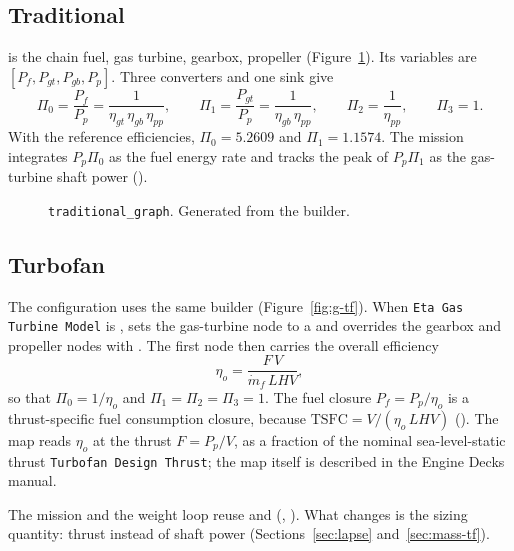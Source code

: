 \documentclass[a4paper,11pt]{article}
\begin{document}
\subsection{Traditional}\label{sec:traditional}
 is the chain fuel, gas turbine,
gearbox, propeller (Figure~\ref{fig:g-trad}). Its variables are
$[P_f, P_{gt}, P_{gb}, P_p]$. Three converters and one sink give
\begin{equation}
  \Pi_0 = \frac{P_f}{P_p} = \frac{1}{\eta_{gt}\,\eta_{gb}\,\eta_{pp}},\qquad
  \Pi_1 = \frac{P_{gt}}{P_p} = \frac{1}{\eta_{gb}\,\eta_{pp}},\qquad
  \Pi_2 = \frac{1}{\eta_{pp}},\qquad \Pi_3 = 1 .
  \label{eq:trad}
\end{equation}
With the reference efficiencies, $\Pi_0 = 5.2609$ and $\Pi_1 = 1.1574$. The mission
integrates $P_p\Pi_0$ as the fuel energy rate and tracks the peak of $P_p\Pi_1$ as the
gas-turbine shaft power ().

\begin{figure}[htbp]
\centering

\caption{\texttt{traditional\_graph}. Generated from the builder.}\label{fig:g-trad}
\end{figure}

\subsection{Turbofan}\label{sec:turbofan}
The  configuration uses the same builder (Figure~\ref{fig:g-tf}). When
\texttt{Eta Gas Turbine Model} is , 
sets the gas-turbine node to a  and overrides the gearbox and
propeller nodes with . The first node then carries the overall
efficiency
\begin{equation}
  \eta_o = \frac{F\,V}{\dot m_f\,LHV} ,
\end{equation}
so that $\Pi_0 = 1/\eta_o$ and $\Pi_1 = \Pi_2 = \Pi_3 = 1$. The fuel closure
$P_f = P_p/\eta_o$ is a thrust-specific fuel consumption closure, because
$\mathrm{TSFC} = V/(\eta_o\,LHV)$ (). The map reads
$\eta_o$ at the thrust $F = P_p/V$, as a fraction of the nominal sea-level-static thrust
\texttt{Turbofan Design Thrust}; the map itself is described in the Engine Decks manual.

The mission and the weight loop reuse  and
 (, ).
What changes is the sizing quantity: thrust instead of shaft power
(Sections~\ref{sec:lapse} and~\ref{sec:mass-tf}).
\end{document}
